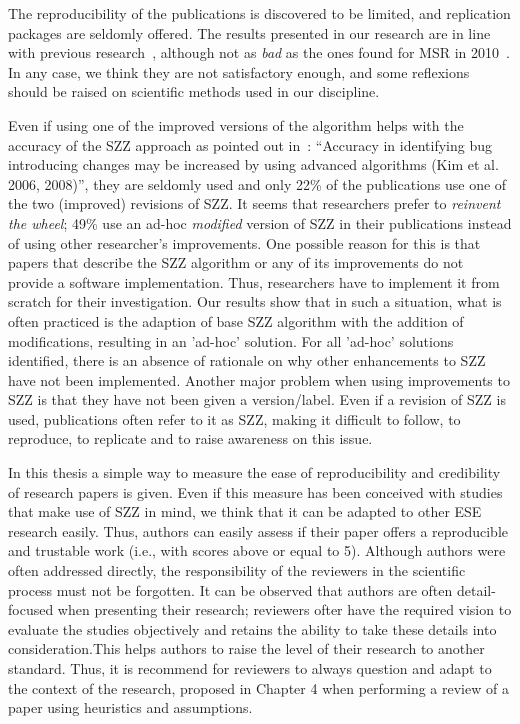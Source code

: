 \documentclass[a4paper, 12pt]{book}
\begin{document}
The reproducibility of the publications is discovered to be limited, and replication packages are seldomly offered. The results presented in our research are in line with previous research~\cite{amann2015software}, although not as \emph{bad} as the ones found for MSR in 2010~\cite{robles2010replicating}. In any case, we think they are not satisfactory enough, and some reflexions should be raised on scientific methods used in our discipline.

Even if using one of the improved versions of the algorithm helps with the accuracy of the SZZ approach as pointed out in~\cite{rahman2012clones}: ``Accuracy in identifying bug introducing changes may be increased by using advanced algorithms (Kim et al. 2006, 2008)'', they are seldomly used and  only 22\% of the publications use one of the two (improved) revisions of SZZ. It seems that researchers prefer to \emph{reinvent the wheel}; 49\% use an ad-hoc \emph{modified} version of SZZ in their publications instead of using other researcher's improvements. One possible reason for this is that papers that describe the SZZ algorithm or any of its improvements do not provide a software implementation. Thus, researchers have to implement it from scratch for their investigation. Our results show that in such a situation, what is often practiced is the adaption of base SZZ algorithm with the addition of modifications, resulting in an 'ad-hoc' solution. For all 'ad-hoc' solutions identified, there is an absence of rationale on why other enhancements to SZZ have not been implemented. Another major problem when using improvements to SZZ is that they have not been given a version/label. Even if a revision of SZZ is used, publications often refer to it as SZZ, making it difficult to follow, to reproduce, to replicate and to raise awareness on this issue.

In this thesis a simple way to measure the ease of reproducibility and credibility of research papers is given. Even if this measure has been conceived with studies that make use of SZZ in mind, we think that it can be adapted to other ESE research easily. Thus, authors can easily assess if their paper offers a reproducible and trustable work (i.e., with scores above or equal to 5). Although authors were often addressed directly, the  responsibility of the reviewers in the scientific process must not be forgotten. It can be observed that authors are often detail-focused when presenting their research; reviewers ofter have the required vision to evaluate the studies objectively and retains the ability to take these details into consideration.This helps authors to raise the level of their research to another standard. Thus, it is recommend for reviewers to always question and adapt to the context of the research, proposed in Chapter 4 when performing a review of a paper using heuristics and assumptions.
\end{document}
